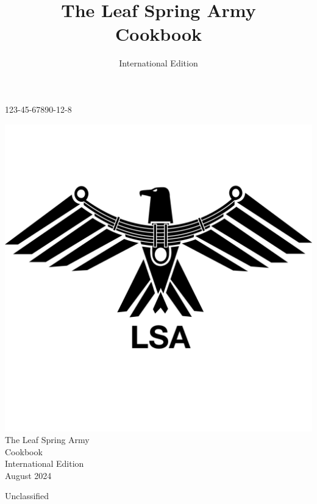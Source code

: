 \documentclass[11pt]{book}
\title{
The Leaf Spring Army\\
Cookbook
}
\author{International Edition}
\date{\publishingdate}
\newcommand{\publishingdate}{August 2024}
\newcommand{\isbn}{123-45-67890-12-8} %
\begin{document}
\pagecolor{teal}


\begin{flushright}
\isbn
\end{flushright}

\begin{center}
\begin{minipage}[b]{12cm}
\begin{center}
\vspace{10mm}
\includegraphics[width=0.4 \paperwidth,height=0.4 \paperheight]{Pictures/other/lsa-eagle-black.png} \\
{\Large The Leaf Spring Army}\\
\vspace{5mm} 
{\Huge Cookbook}\\
\vspace{20mm}
{\Large International Edition}\\
\vspace{5mm} 
{\Large \publishingdate}
\end{center}
\end{minipage}

\vfill

Unclassified

\end{center}
\end{document}
